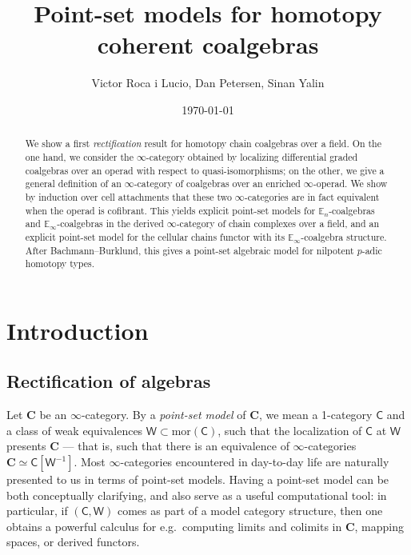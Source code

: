 \documentclass[a4paper,12pt]{amsart}
\title{Point-set models for homotopy coherent coalgebras}
\author{\quad Victor Roca i Lucio, \quad Dan Petersen, \quad Sinan Yalin}
\date{\today}
\theoremstyle{plain}
\theoremstyle{definition}
\theoremstyle{remark}
\begin{document}
\begin{abstract}We show a first \emph{rectification} result for homotopy chain coalgebras over a field. On the one hand, we consider the $\infty$-category obtained by localizing  differential graded coalgebras over an operad with respect to quasi-isomorphisms; on the other, we give a general definition of an $\infty$-category of coalgebras over an enriched $\infty$-operad. We show by induction over cell attachments that these two $\infty$-categories are in fact equivalent when the operad is cofibrant. This yields explicit point-set models for $\mathbb{E}_n$-coalgebras and $\mathbb{E}_\infty$-coalgebras in the derived $\infty$-category of chain complexes over a field, and an explicit point-set model for the cellular chains functor with its $\mathbb{E}_\infty$-coalgebra structure. After Bachmann--Burklund, this gives a point-set algebraic model for nilpotent $p$-adic homotopy types. 
\end{abstract}

\maketitle

\tableofcontents

\section{Introduction}

\vspace{2pc}

\subsection{Rectification of algebras} Let $\mathbf C$ be an $\infty$-category. By a \emph{point-set model} of $\mathbf C$, we mean a 1-category $\mathsf C$ and a class of weak equivalences $\mathsf W \subset \mathrm{mor}(\mathsf C)$, such that the localization of $\mathsf C$ at $\mathsf W$ presents $\mathbf C$ --- that is, such that there is an equivalence of $\infty$-categories $\mathbf C \simeq \mathsf C[\mathsf W^{-1}]$. %
Most $\infty$-categories encountered in day-to-day life are naturally presented to us in terms of point-set models. Having a point-set model can be both conceptually clarifying, and also serve as a useful computational tool: in particular, if $(\mathsf C,\mathsf W)$ comes as part of a model category structure, then one obtains a powerful calculus for e.g.\ computing limits and colimits in $\mathbf C$, mapping spaces, or derived functors. 
\end{document}
